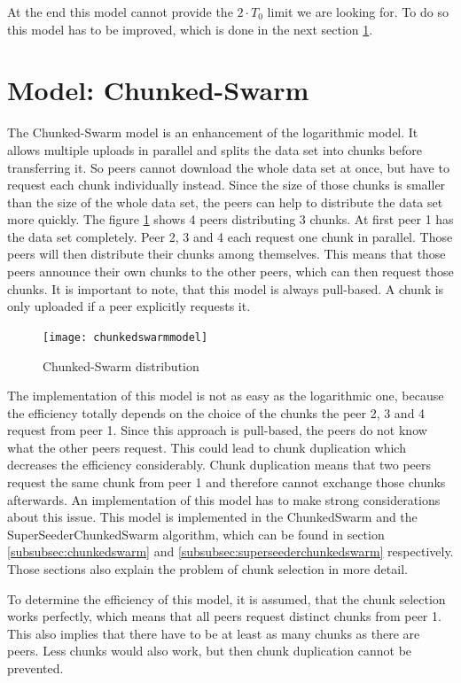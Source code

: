 At the end this model cannot provide the $2 \cdot T_0$ limit we are looking for. To do so this model has to be improved, which is done in the next section \ref{subsubsec:chunkedswarmmodel}.


\section{Model: Chunked-Swarm}
\label{subsubsec:chunkedswarmmodel}
The Chunked-Swarm model is an enhancement of the logarithmic model. It allows multiple uploads in parallel and splits the data set into chunks before transferring it. So peers cannot download the whole data set at once, but have to request each chunk individually instead. Since the size of those chunks is smaller than the size of the whole data set, the peers can help to distribute the data set more quickly. The figure \ref{fig:chunkedswarmmodel} shows 4 peers distributing 3 chunks. At first peer 1 has the data set completely. Peer 2, 3 and 4 each request one chunk in parallel. Those peers will then distribute their chunks among themselves. This means that those peers announce their own chunks to the other peers, which can then request those chunks. It is important to note, that this model is always pull-based. A chunk is only uploaded if a peer explicitly requests it.

\begin{figure}[H]
\centering
\texttt{[image: chunkedswarmmodel]}
\caption{Chunked-Swarm distribution}
\label{fig:chunkedswarmmodel}
\end{figure}

The implementation of this model is not as easy as the logarithmic one, because the efficiency totally depends on the choice of the chunks the peer 2, 3 and 4 request from peer 1. Since this approach is pull-based, the peers do not know what the other peers request. This could lead to chunk duplication which decreases the efficiency considerably. Chunk duplication means that two peers request the same chunk from peer 1 and therefore cannot exchange those chunks afterwards. An implementation of this model has to make strong considerations about this issue. This model is implemented in the ChunkedSwarm and the SuperSeederChunkedSwarm algorithm, which can be found in section \ref{subsubsec:chunkedswarm} and \ref{subsubsec:superseederchunkedswarm} respectively. Those sections also explain the problem of chunk selection in more detail.

To determine the efficiency of this model, it is assumed, that the chunk selection works perfectly, which means that all peers request distinct chunks from peer 1. This also implies that there have to be at least as many chunks as there are peers. Less chunks would also work, but then chunk duplication cannot be prevented.

